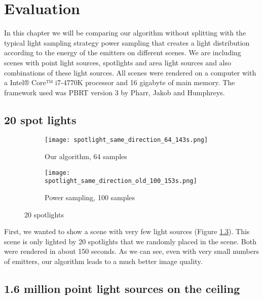 
\chapter{Evaluation}
\label{ch:Evaluation}

In this chapter we will be comparing our algorithm without splitting with the typical light sampling strategy power sampling that creates a light distribution according to the energy of the emitters on different scenes. We are including scenes with point light sources, spotlights and area light sources and also combinations of these light sources. All scenes were rendered on a computer with a Intel® Core™ i7-4770K processor and 16 gigabyte of main memory. The framework used was PBRT version 3 by Pharr, Jakob and Humphreys. \cite{PBRT}

\section{20 spot lights}

\begin{figure}
	\centering
	\begin{subfigure}{.5\textwidth}
		\centering
		\texttt{[image: spotlight\_same\_direction\_64\_143s.png]}
		\caption{Our algorithm, 64 samples}
		\label{fig:spot1}
	\end{subfigure}%
	\begin{subfigure}{.5\textwidth}
		\centering
		\texttt{[image: spotlight\_same\_direction\_old\_100\_153s.png]}
		\caption{Power sampling, 100 samples}
		\label{fig:spot2}
	\end{subfigure}
	\caption{20 spotlights}
	\label{fig:spot}
\end{figure}

First, we wanted to show a scene with very few light sources (Figure \ref{fig:spot}). This scene is only lighted by 20 spotlights that we randomly placed in the scene. Both were rendered in about 150 seconds. As we can see, even with very small numbers of emitters, our algorithm leads to a much better image quality.

\section{1.6 million point light sources on the ceiling}

